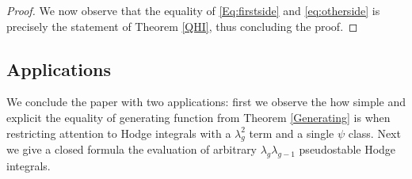 \documentclass[leqno,12pt]{amsart}
\theoremstyle{remark}
\numberwithin{equation}{section}
\DeclareMathOperator{\ps}{ps}
\begin{document}
\begin{proof}
   We now observe that the equality of \eqref{Eq:firstside} and \eqref{eq:otherside} is precisely the statement of  Theorem \ref{QHI}, thus concluding the proof.
   
\end{proof}

\subsection{Applications} We conclude the paper with two applications: first we observe the how simple and explicit the equality of generating function from Theorem \ref{Generating} is when restricting attention to Hodge integrals with a $\lambda_g^2$ term and a single $\psi$ class. Next we give a closed formula the evaluation of arbitrary $\lambda_g\lambda_{g-1}$ pseudostable Hodge integrals.
\end{document}
